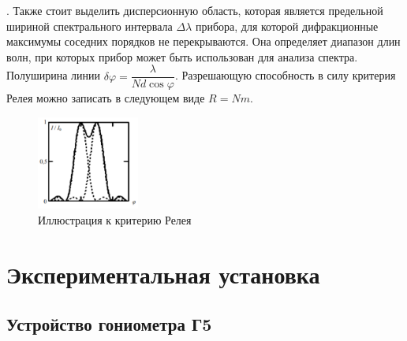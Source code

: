 \documentclass[a4paper, 12pt]{article}
\begin{document}
. Также стоит выделить дисперсионную область, которая является предельной шириной спектрального интервала $\Delta \lambda$ прибора, для которой дифракционные максимумы соседних порядков не перекрываются. Она определяет диапазон длин волн, при которых прибор может быть использован для анализа спектра.
Полуширина линии $\delta \varphi = \dfrac{\lambda}{Nd\cos \varphi}$.
Разрешающую способность в силу критерия Релея можно записать в следующем виде $R = Nm$.

\begin{figure}[h]
\begin{center}
\includegraphics[width=0.3\textwidth]{Критерий_Релея.png}
\end{center}
\caption{Иллюстрация к критерию Релея} \label{Критерий Релея}
\end{figure}

\section*{Экспериментальная установка}

\subsection*{Устройство гониометра Г5}
\end{document}

